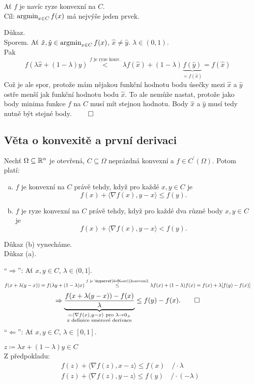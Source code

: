 Ať $f$ je navíc ryze konvexní na $C$.\\
Cíl: $\operatorname*{argmin}_{x \in C} f(x)$ má nejvýše jeden prvek.

Důkaz.\\
Sporem. Ať $\hat x, \hat y \in \operatorname*{argmin}_{x \in C} f(x)$, $\hat x \not=\hat y$. $\lambda \in (0,1)$.\\
Pak
\[
    f(\lambda \hat x  + (1-\lambda) \hat y) \overset{f \text{ je ryze konv.}}{<} \lambda f(\hat x) + (1-\lambda) 
    \underbrace{f(\hat y)}_{= f(\hat x)} = f(\hat x)
\]
Což je ale spor, protože mám nějakou funkční hodnotu bodu úsečky mezi $\hat x$ a $\hat y$ ostře menší jak funkční 
hodnotu bodu $\hat x$. To ale nemůže nastat, protože jako body minima funkce $f$ na $C$ musí mít stejnou hodnotu. Body
$\hat x$ a $\hat y$ musí tedy nutně být stejné body. $\qed$

\subsection{Věta o konvexitě a první derivaci}\label{konvDeriv} %
Nechť $\Omega \subseteq \mathbb{R}^n$ je otevřená, $C \subseteq \Omega$ neprázdná konvexní a $f \in C^{'} (\Omega)$. Potom platí:
\begin{enumerate}[(a)]
    \item $f$ je konvexní na $C$ právě tehdy, když pro každé $x, y \in C$ je
    \[
        f(x) + \langle \nabla f(x), y-x\rangle \leq f(y).
    \]
    \item $f$ je ryze konvexní na $C$ právě tehdy, když pro každé dva různé body $x, y \in C$ je 
    \[
        f(x) + \langle \nabla f(x), y-x\rangle < f(y).
    \]
\end{enumerate}
Důkaz (b) vynecháme.
\\

Důkaz (a).

\enquote{$\Rightarrow$}: Ať $x, y \in C$, $\lambda \in (0,1]$.
\[
    f(x + \lambda (y-x)) = f(\lambda y + (1-\lambda)x) \overset{f \text{ je \hyperref[defKonv]{konvexní}}}{\leq} 
    \lambda f(x) + (1 - \lambda)f(x) = f(x) + \lambda [f(y) - f(x)]
\]
\[
    \Rightarrow \underbrace {\frac {f(x + \lambda (y-x)) - f(x)}{\lambda}}_{\substack{{ = \langle \nabla f(x), 
    y-x\rangle \text{ pro } \lambda \rightarrow 0_+}\\{\text{z definice směrové derivace}}}} \leq f(y) - f(x). \qed
\]
\enquote{$\Leftarrow$}: Ať $x, y \in C$, $\lambda \in [0,1]$.

$z \coloneq \lambda x + (1-\lambda) y \in C$\\
Z předpokladu:
\begin{align}
    & f(z) + \langle \nabla f(z), x - z\rangle \leq f(x) \quad / \cdot \lambda \\
    & f(z) + \langle \nabla f(z), y - z\rangle \leq f(y) \quad / \cdot (- \lambda)
\end{align}

